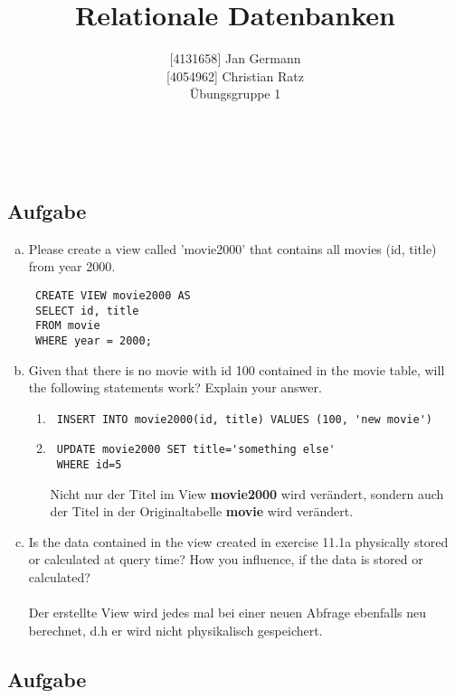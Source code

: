 \documentclass[11pt,a4paper,DIV=9]{scrartcl}
\author{{[}4131658{]} Jan Germann \\{[}4054962{]} Christian Ratz\\Übungsgruppe 1}
\title{Relationale Datenbanken}
\newcounter{temp}
\newcommand{\aufgabe}[1]{
  \setcounter{temp}{\value{subsection}}
  \setcounter{subsection}{#1}
  \addtocounter{subsection}{-1}
  \subsection{Aufgabe}
  \setcounter{subsection}{\value{temp}}
}
\renewcommand{\author}[1]{\renewcommand{\author}{#1}}
\renewcommand{\title}[1]{\renewcommand{\title}{#1}}
\newcommand{\makehomeworktitle}{
  \begin{minipage}[t]{6.5cm}
    \sf{\author}
  \end{minipage}
  \begin{minipage}[t]{6.5cm}
    \begin{flushright}
      \sf{\title\\\today}
    \end{flushright}
  \end{minipage}
  \\[0.2cm]
  \begin{center}
    \sf{
      \color{blue}{
        \LARGE{Aufgabenblatt \blattnr}
      }
    }
  \end{center}
  \vspace{0.1cm}
}
\begin{document}
\makehomeworktitle
   \aufgabe{1}
     \begin{enumerate}[a.]
 \item Please create a view called 'movie2000' that contains all movies (id, title) from year 2000.
 \begin{lstlisting}
 CREATE VIEW movie2000 AS
 SELECT id, title
 FROM movie
 WHERE year = 2000;
 \end{lstlisting}
 \item Given that there is no movie with id 100 contained in the movie table, will the following statements work? Explain your answer.
 \begin{enumerate}[1.]
 \item 
 \begin{lstlisting}
 INSERT INTO movie2000(id, title) VALUES (100, 'new movie')
 \end{lstlisting}
 
 \item 
 \begin{lstlisting}
 UPDATE movie2000 SET title='something else'
 WHERE id=5
 \end{lstlisting}
 Nicht nur der Titel im View \textbf{movie2000} wird ver\"andert, sondern auch der Titel in der Originaltabelle \textbf{movie} wird ver\"andert.
 \end{enumerate}
 \item Is the data contained in the view created in exercise 11.1a physically stored or calculated at query time? How you influence, if the data is stored or calculated? \\\\
 Der erstellte View wird jedes mal bei einer neuen Abfrage ebenfalls neu berechnet, d.h er wird nicht physikalisch gespeichert.
 \end{enumerate}
\aufgabe{2}
\end{document}
